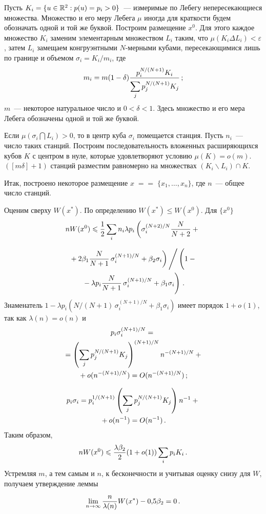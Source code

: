\begin{multicols}{2}
Пусть $K_i=\{u\in {\mathbb {R}}^2: p(u)=p_i>0 \}$~--- измеримые по Лебегу непересекающиеся
множества. Множество и его меру Лебега $\mu$ иногда для краткости будем обозначать одной
и той же бук\-вой. Построим размещение $x^0$. Для этого каждое множество $K_i$ заменим
элементарным множеством $L_i$ таким, что $\mu(K_i \Delta L_i)<\varepsilon $, затем $L_i$
замещаем конгруэнтными $N$-мерными кубами, пе\-ре\-се\-ка\-ющи\-ми\-ся лишь по границе и объемом
$\sigma_i=K_i/m_i$, где
$$
m_i=m (1-\delta) \displaystyle\frac{\displaystyle p_i^{N/(N+1)}K_i\mathstrut}{\displaystyle \sum\limits_{j}^{} p_j^{N/(N+1)}K_j\mathstrut}\,;
$$
$m$~---
некоторое натуральное число и $0<\delta<1$. Здесь множество и его мера Лебега обозначены одной
и той же буквой.

Если $\mu(\sigma_i \bigcap L_i)>0$, то в центр куба $\sigma_i$ помещается станция. Пусть
$n_i$~--- число таких станций. Построим последовательность вложенных рас\-ши\-ря\-ющих\-ся кубов
$K$ с центром в нуле, которые удовлетворяют условию  $\mu(K) = o(m)$.
$([m\delta]+1)$
станций разместим равномерно на множествах $(K_i\backslash L_i)\cap K$.

Итак, построено некоторое размещение $x\;=$\linebreak $=\;\{x_1,\ldots,x_n \}$, где $n$~--- общее число станций.

Оценим сверху $W(x^*)$. По определению $W(x^*)\leqslant W(x^0)$. Для $\{x^0\}$
%
\begin{equation*} %
n W(x^0)\leqslant \fr{1}{2} \suml{i}{}n_i
\lambda p_i\left (
\sigma_i^{(N+2)/N}\fr{N}{N+2}+{}\right. %
\end{equation*}

\noindent
\begin{multline*}
\left.{}+2 \beta_1 \displaystyle\frac{\displaystyle N\mathstrut}{\displaystyle N+1\mathstrut}\,\sigma_i^{(N+1)/N}+
\beta_2\sigma_i\right )\Bigg /\left (\vphantom{\Bigg /}
 1 - {}\right.\\
\left.{}-\lambda p_i\displaystyle\frac{\displaystyle N\mathstrut}{\displaystyle N+1\mathstrut}\,\sigma_i^{(N+1)/N}+\beta_1 \sigma_i
\vphantom{\Bigg /}\right )\,.
\end{multline*}
Знаменатель $1-\lambda p_i \left ( N/(N+1)\,\sigma_i^{(N+1)/N}+ \beta_1 \sigma_i\right )$
имеет порядок $1+o(1)$, так как $\lambda(n)=o(n)$ и
\begin{multline*}
p_i\sigma_i^{(N+1)/N}={}\\
{}=
\left(\sum\limits_{j}^{}p_j^{N/(N+1)}K_j\right)^{(N+1)/N}n^{-(N+1)/N}+{}\\
{}+o(n^{-(N+1)/N})=O(n^{-(N+1)/N})\,;
\end{multline*}

\noindent
\begin{multline*}
p_i\sigma_i=p_i^{1/(N+1)}\left(\sum\limits_{j}^{}p_j^{N/(N+1)}K_j\right)n^{-1}+{}\\
{}+o(n^{-1})=O(n^{-1})\,.
\end{multline*}
Таким образом,
$$
n W(x^0)\leqslant \displaystyle\frac{\displaystyle \lambda\beta_2\mathstrut}{\displaystyle 2\mathstrut}(1+o(1)) \sum\limits_{i}^{}p_iK_i\,.
$$
Устремляя $m$, а тем самым и $n$, к бесконечности и учитывая оценку снизу для $W$,
получаем утверждение леммы
$$
\lim\limits_{n\rightarrow\infty}\displaystyle\frac{\displaystyle n\mathstrut}{\displaystyle \lambda(n)\mathstrut}W(x^*)-0{,}5\beta_2=0\,.
$$


\end{multicols}
